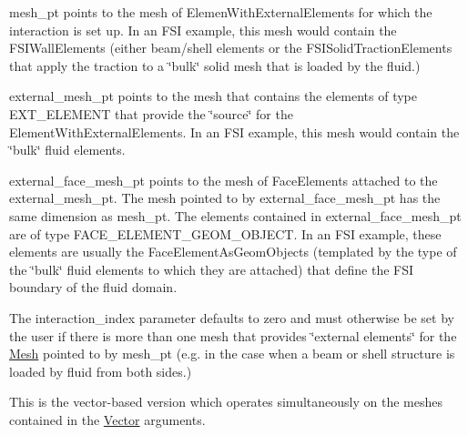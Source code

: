 \begin{DoxyItemize}
\item {\ttfamily mesh\+\_\+pt} points to the mesh of {\ttfamily Elemen\+With\+External\+Elements} for which the interaction is set up. In an F\+SI example, this mesh would contain the {\ttfamily F\+S\+I\+Wall\+Elements} (either beam/shell elements or the {\ttfamily F\+S\+I\+Solid\+Traction\+Elements} that apply the traction to a \char`\"{}bulk\char`\"{} solid mesh that is loaded by the fluid.)
\item {\ttfamily external\+\_\+mesh\+\_\+pt} points to the mesh that contains the elements of type E\+X\+T\+\_\+\+E\+L\+E\+M\+E\+NT that provide the \char`\"{}source\char`\"{} for the {\ttfamily Element\+With\+External\+Elements}. In an F\+SI example, this mesh would contain the \char`\"{}bulk\char`\"{} fluid elements.
\item {\ttfamily external\+\_\+face\+\_\+mesh\+\_\+pt} points to the mesh of {\ttfamily Face\+Elements} attached to the {\ttfamily external\+\_\+mesh\+\_\+pt}. The mesh pointed to by {\ttfamily external\+\_\+face\+\_\+mesh\+\_\+pt} has the same dimension as {\ttfamily mesh\+\_\+pt}. The elements contained in {\ttfamily external\+\_\+face\+\_\+mesh\+\_\+pt} are of type F\+A\+C\+E\+\_\+\+E\+L\+E\+M\+E\+N\+T\+\_\+\+G\+E\+O\+M\+\_\+\+O\+B\+J\+E\+CT. In an F\+SI example, these elements are usually the {\ttfamily Face\+Element\+As\+Geom\+Objects} (templated by the type of the \char`\"{}bulk\char`\"{} fluid elements to which they are attached) that define the F\+SI boundary of the fluid domain.
\item The interaction\+\_\+index parameter defaults to zero and must otherwise be set by the user if there is more than one mesh that provides \char`\"{}external
  elements\char`\"{} for the \hyperlink{classoomph_1_1Mesh}{Mesh} pointed to by mesh\+\_\+pt (e.\+g. in the case when a beam or shell structure is loaded by fluid from both sides.)
\end{DoxyItemize}This is the vector-\/based version which operates simultaneously on the meshes contained in the \hyperlink{classoomph_1_1Vector}{Vector} arguments.

